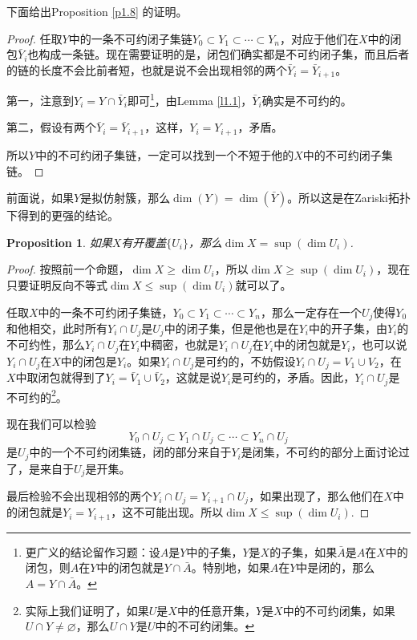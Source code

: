 \documentclass[9pt]{extbook}
\theoremstyle{plain}%
\newtheorem{pro}[defi]{Proposition}%
\begin{document}
下面给出Proposition \ref{p1.8} 的证明。
\begin{proof}
任取$Y$中的一条不可约闭子集链$Y_0\subset Y_1\subset \cdots \subset Y_n$，对应于他们在$X$中的闭包$\bar{Y}_i$也构成一条链。现在需要证明的是，闭包们确实都是不可约闭子集，而且后者的链的长度不会比前者短，也就是说不会出现相邻的两个$\bar{Y}_i=\bar{Y}_{i+1}$。

第一，注意到$Y_i=Y\cap \bar{Y}_i$即可\footnote{更广义的结论留作习题：设$A$是$Y$中的子集，$Y$是$X$的子集，如果$\bar{A}$是$A$在$X$中的闭包，则$A$在$Y$中的闭包就是$Y\cap \bar{A}$。特别地，如果$A$在$Y$中是闭的，那么$A=Y\cap \bar{A}$。}，由Lemma \ref{l1.1}，$\bar{Y}_i$确实是不可约的。

第二，假设有两个$\bar{Y}_i=\bar{Y}_{i+1}$，这样，$Y_i=Y_{i+1}$，矛盾。

所以$Y$中的不可约闭子集链，一定可以找到一个不短于他的$X$中的不可约闭子集链。
\end{proof}

前面说，如果$Y$是拟仿射簇，那么$\dim(Y)=\dim(\bar{Y})$。所以这是在Zariski拓扑下得到的更强的结论。

\begin{pro}
如果$X$有开覆盖$\{U_i\}$，那么$\dim X=\sup(\dim U_i)$.
\label{p1.9}
\end{pro}
\begin{proof}
按照前一个命题，$\dim X\geq \dim U_i$，所以$\dim X\geq \sup(\dim U_i)$，现在只要证明反向不等式$\dim X\leq \sup(\dim U_i)$就可以了。

任取$X$中的一条不可约闭子集链，$Y_0\subset Y_1\subset \cdots \subset Y_n$，那么一定存在一个$U_j$使得$Y_0$和他相交，此时所有$Y_i\cap U_j$是$U_j$中的闭子集，但是他也是在$Y_i$中的开子集，由$Y_i$的不可约性，那么$Y_i\cap U_j$在$Y_i$中稠密，也就是$Y_i\cap U_j$在$Y_i$中的闭包就是$Y_i$，也可以说$Y_i\cap U_j$在$X$中的闭包是$Y_i$。如果$Y_i\cap U_j$是可约的，不妨假设$Y_i\cap U_j=V_1\cup V_2$，在$X$中取闭包就得到了$Y_i=\bar{V}_1\cup \bar{V}_2$，这就是说$Y_i$是可约的，矛盾。因此，$Y_i\cap U_j$是不可约的\footnote{实际上我们证明了，如果$U$是$X$中的任意开集，$Y$是$X$中的不可约闭集，如果$U\cap Y\neq \varnothing$，那么$U\cap Y$是$U$中的不可约闭集。}。

现在我们可以检验
\[
	Y_0\cap U_j\subset Y_1\cap U_j\subset \cdots \subset Y_n\cap U_j
\]
是$U_j$中的一个不可约闭集链，闭的部分来自于$Y_i$是闭集，不可约的部分上面讨论过了，是来自于$U_j$是开集。

最后检验不会出现相邻的两个$Y_i\cap U_j=Y_{i+1}\cap U_j$，如果出现了，那么他们在$X$中的闭包就是$Y_i=Y_{i+1}$，这不可能出现。所以$\dim X\leq \sup(\dim U_i)$.
\end{proof}
\end{document}
